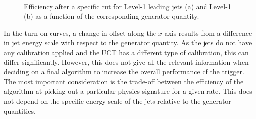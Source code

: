 \begin{figure}
  \centering
  \\ 
  \caption{ Efficiency after a specific cut for Level-1 leading jets (a) and Level-1 \HT
  (b) as a function of the corresponding generator quantity.
  } \label{fig:turnons}
\end{figure}

In the turn on curves, a change in offset along the $x$-axis results
from a difference in jet energy scale with respect to the generator
quantity. As the \GCT jets do not have any calibration applied and the
UCT has a different type of calibration, this can differ
significantly. However, this does not give all the relevant
information when deciding on a final algorithm to increase the overall
performance of the trigger. The most important consideration is the
trade-off between the efficiency of the algorithm at picking out a
particular physics signature for a given rate. This does not depend on
the specific energy scale of the jets relative to the generator
quantities.

